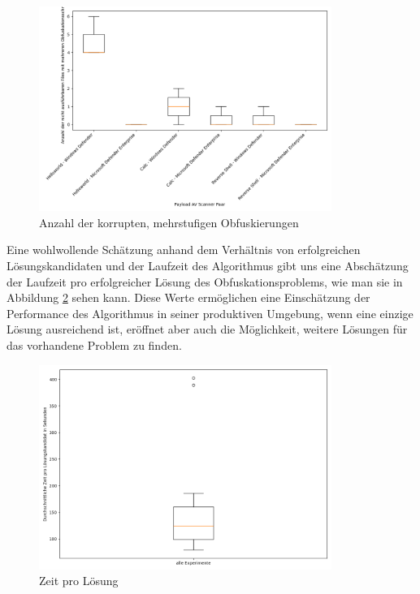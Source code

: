 \begin{figure}[h]
    \centering
    \includegraphics[width=0.85\textwidth]{gfx/Desktriptiv/multicor_overview.png}
    \caption{Anzahl der korrupten, mehrstufigen Obfuskierungen}
    \label{fig:multicor_overview}
\end{figure}

Eine wohlwollende Schätzung anhand dem Verhältnis von erfolgreichen Lösungskandidaten und der Laufzeit des Algorithmus gibt uns eine Abschätzung der Laufzeit pro erfolgreicher Lösung des Obfuskationsproblems, wie man sie in Abbildung \ref{fig:time_per_evasion} sehen kann. Diese Werte ermöglichen eine Einschätzung der Performance des Algorithmus in seiner produktiven Umgebung, wenn eine einzige Lösung ausreichend ist, eröffnet aber auch die Möglichkeit, weitere Lösungen für das vorhandene Problem zu finden.
\begin{figure}[h]
    \centering
    \includegraphics[width=0.85\textwidth]{gfx/Hypothesendiagramme/time_per_evasion.png}
    \caption{Zeit pro Lösung}
    \label{fig:time_per_evasion}
\end{figure}